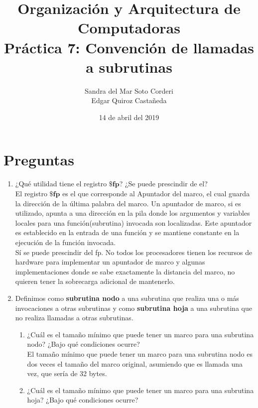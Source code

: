 \documentclass{article}
\begin{document}
    \title{
        Organización y Arquitectura de Computadoras \\
        Práctica 7: Convención de llamadas a subrutinas \\
    }
    \date{
        14 de abril del 2019
    }
    \author{
        Sandra del Mar Soto Corderi \\
        Edgar Quiroz Castañeda
    }
    \maketitle

    \section{Preguntas}
    \begin{enumerate}
    
    \item {
    ¿Qué utilidad tiene el registro $\textbf{\$fp}$? ¿Se puede prescindir de el?\\
	
	El registro $\textbf{\$fp}$ es el que corresponde al Apuntador del marco, el cual guarda la dirección de la última palabra del marco. Un apuntador de marco, si es utilizado, apunta a una dirección en la pila donde los argumentos y variables locales para una función(subrutina) invocada son localizadas. Este apuntador es establecido en la entrada de una función y se mantiene constante en la ejecución de la función invocada.\\
	
	Sí se puede prescindir del fp. No todos los procesadores tienen los recursos de hardware para implementar un apuntador de marco y algunas implementaciones donde se sabe exactamente la distancia del marco, no quieren tener la sobrecarga adicional de mantenerlo.\\  
	}
	\item {
	Definimos como \textbf{subrutina nodo} a una subrutina que realiza una o más
	invocaciones a otras subrutinas y como \textbf{subrutina hoja} a una subrutina
	que no realiza llamadas a otras subrutinas.
	
		\begin{enumerate}
			\item {
			¿Cuál es el tamaño mínimo que puede tener un marco para una subrutina nodo? ¿Bajo qué condiciones ocurre?\\
			
			El tamaño mínimo que puede tener un marco para una subrutina nodo es dos veces el tamaño del marco original, asumiendo que es llamada una vez, que sería de 32 bytes.\\
			}
			\item {
			¿Cuál es el tamaño mínimo que puede tener un marco para una subrutina hoja? ¿Bajo qué condiciones ocurre?\\
			
}
\end{enumerate}}
\end{enumerate}
\end{document}
